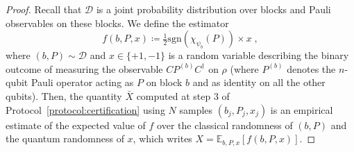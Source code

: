 \documentclass[a4paper,twocolumn,11pt,unpublished]{quantumarticle}
\newcommand{\sgn}{\mathrm{sgn}}
\newcommand{\jdist}{\mathcal D} %
\begin{document}
        \begin{proof}
        Recall that $\jdist$ is a joint probability distribution over blocks and Pauli observables on these blocks. We define the estimator
        \begin{equation}
        \label{def_f}
            f(b,P,x)\coloneqq \tfrac 1 2 \sgn(\chi_{\psi_b}(P)) \times x\;,
        \end{equation}
            where $(b,P)\sim\mathcal D$ and $x\in\{+1, -1\}$ is a random variable describing the binary outcome of measuring the observable $C P^{(b)}C^\dagger$ on $\rho$ (where $P^{(b)}$ denotes the $n$-qubit Pauli operator acting as $P$ on block $b$ and as identity on all the other qubits). Then, the quantity $\bar X$ computed at step $3$ of Protocol~\ref{protocol:certification} using $N$ samples $(b_j,P_j,x_j)$ is an empirical estimate of the expected value of $f$ over the classical randomness of $(b,P)$ and the quantum randomness of $x$, which writes $X=\mathbb E_{b,P,x}[f(b,P,x)]$.
        

\end{proof}
\end{document}

